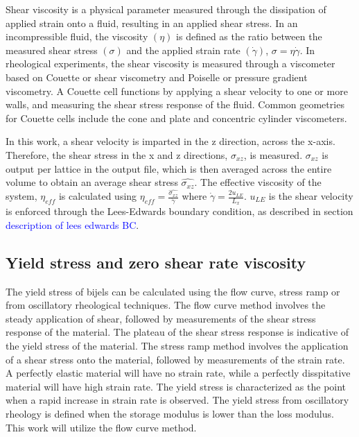 Shear viscosity is a physical parameter measured through the dissipation of applied strain onto a fluid, resulting in 
an applied shear stress. In an incompressible fluid, the viscosity $(\eta)$ is defined as the ratio between the measured 
shear stress $(\sigma)$ and the applied strain rate $(\dot{\gamma})$, $\sigma = \eta \dot{\gamma}$. In rheological 
experiments, the shear viscosity is measured through a viscometer based on Couette or shear viscometry and Poiselle or 
pressure gradient viscometry. A Couette cell functions by applying a shear velocity to one or more walls, and measuring 
the shear stress response of the fluid. Common geometries for Couette cells include the cone and plate and concentric 
cylinder viscometers. 

In this work, a shear velocity is imparted in the z direction, across the x-axis. Therefore, the shear stress in the x 
and z directions, $\sigma_{xz}$, is measured. $\sigma_{xz}$ is output per lattice in the output file, which is then 
averaged across the entire volume to obtain an average shear stress $\hat{\sigma_{xz}}$. The effective viscosity of the 
system, $\eta_{eff}$ is calculated using $\eta_{eff} = \frac{\hat{\sigma_{xz}}}{\dot{\gamma}}$ where $\dot{\gamma} = 
\frac{2 u_{LE}}{L_x}$. $u_{LE}$ is the shear velocity is enforced through the Lees-Edwards boundary condition, as 
described in section \textcolor{blue}{description of lees edwards BC}.

\subsection{Yield stress and zero shear rate viscosity}
\label{section:yield_stress}

The yield stress of bijels can be calculated using the flow curve, stress ramp or from oscillatory rheological techniques. 
The flow curve method involves the steady application of shear, followed by measurements of the shear stress response of 
the material. The plateau of the shear stress response is indicative of the yield stress of the material. The stress ramp 
method involves the application of a shear stress onto the material, followed by measurements of the strain rate. A 
perfectly elastic material will have no strain rate, while a perfectly disspitative material will have high strain rate. 
The yield stress is characterized as the point when a rapid increase in strain rate is observed. The yield stress from 
oscillatory rheology is defined when the storage modulus is lower than the loss modulus. This work will utilize the flow 
curve method.

